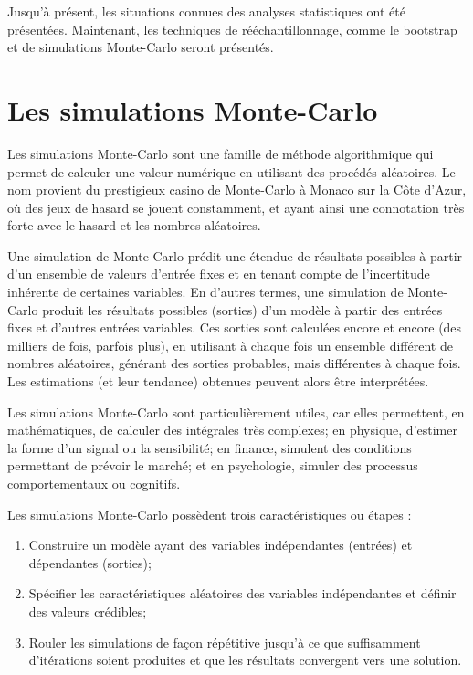 \documentclass[
]{book}
\begin{document}
Jusqu'à présent, les situations connues des analyses statistiques ont été présentées. Maintenant, les techniques de rééchantillonnage, comme le bootstrap et de simulations Monte-Carlo seront présentés.

\hypertarget{les-simulations-monte-carlo}{%
\section{Les simulations Monte-Carlo}\label{les-simulations-monte-carlo}}

Les simulations Monte-Carlo sont une famille de méthode algorithmique qui permet de calculer une valeur numérique en utilisant des procédés aléatoires. Le nom provient du prestigieux casino de Monte-Carlo à Monaco sur la Côte d'Azur, où des jeux de hasard se jouent constamment, et ayant ainsi une connotation très forte avec le hasard et les nombres aléatoires.

Une simulation de Monte-Carlo prédit une étendue de résultats possibles à partir d'un ensemble de valeurs d'entrée fixes et en tenant compte de l'incertitude inhérente de certaines variables. En d'autres termes, une simulation de Monte-Carlo produit les résultats possibles (sorties) d'un modèle à partir des entrées fixes et d'autres entrées variables. Ces sorties sont calculées encore et encore (des milliers de fois, parfois plus), en utilisant à chaque fois un ensemble différent de nombres aléatoires, générant des sorties probables, mais différentes à chaque fois. Les estimations (et leur tendance) obtenues peuvent alors être interprétées.

Les simulations Monte-Carlo sont particulièrement utiles, car elles permettent, en mathématiques, de calculer des intégrales très complexes; en physique, d'estimer la forme d'un signal ou la sensibilité; en finance, simulent des conditions permettant de prévoir le marché; et en psychologie, simuler des processus comportementaux ou cognitifs.

Les simulations Monte-Carlo possèdent trois caractéristiques ou étapes :

\begin{enumerate}
\def\labelenumi{\arabic{enumi}.}
\item
  Construire un modèle ayant des variables indépendantes (entrées) et dépendantes (sorties);
\item
  Spécifier les caractéristiques aléatoires des variables indépendantes et définir des valeurs crédibles;
\item
  Rouler les simulations de façon répétitive jusqu'à ce que suffisamment d'itérations soient produites et que les résultats convergent vers une solution.
\end{enumerate}
\end{document}
